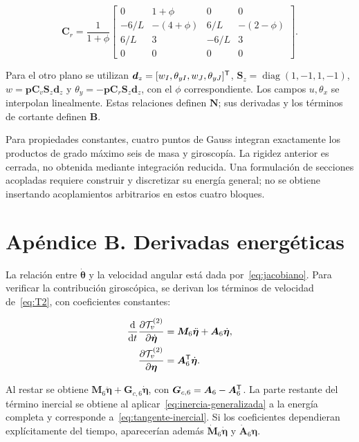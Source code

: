 \begin{equation}
\bm C_r=\frac1{1+\phi}\begin{bmatrix}
0&1+\phi&0&0\\
-6/L&-(4+\phi)&6/L&-(2-\phi)\\
6/L&3&-6/L&3\\0&0&0&0
\end{bmatrix}.
\end{equation}

Para el otro plano se utilizan $\bm d_z=[w_I,\theta_{yI},w_J,\theta_{yJ}]^\mathsf T$, $\bm S_z=\operatorname{diag}(1,-1,1,-1)$, $w=\bm p\bm C_v\bm S_z\bm d_z$ y $\theta_y=-\bm p\bm C_r\bm S_z\bm d_z$, con el $\phi$ correspondiente. Los campos $u,\theta_x$ se interpolan linealmente. Estas relaciones definen $\bm N$; sus derivadas y los términos de cortante definen $\bm B$.

Para propiedades constantes, cuatro puntos de Gauss integran exactamente los productos de grado máximo seis de masa y giroscopía. La rigidez anterior es cerrada, no obtenida mediante integración reducida. Una formulación de secciones acopladas requiere construir y discretizar su energía general; no se obtiene insertando acoplamientos arbitrarios en estos cuatro bloques.

\section{Apéndice B. Derivadas energéticas}
La relación entre $\dot{\bm\theta}$ y la velocidad angular está dada por~\eqref{eq:jacobiano}. Para verificar la contribución giroscópica, se derivan los términos de velocidad de~\eqref{eq:T2}, con coeficientes constantes:

\begin{align}
\frac{\mathrm d}{\mathrm d t}\frac{\partial\mathcal T_v^{(2)}}{\partial\dot{\bm\eta}}
&=\bm M_6\ddot{\bm\eta}+\bm A_6\dot{\bm\eta},\nonumber\\
\frac{\partial\mathcal T_v^{(2)}}{\partial\bm\eta}
&=\bm A_6^\mathsf T\dot{\bm\eta}.
\end{align}

Al restar se obtiene $\bm M_6\ddot{\bm\eta}+\bm G_{c,6}\dot{\bm\eta}$, con $\bm G_{c,6}=\bm A_6-\bm A_6^\mathsf T$. La parte restante del término inercial se obtiene al aplicar~\eqref{eq:inercia-generalizada} a la energía completa y corresponde a~\eqref{eq:tangente-inercial}. Si los coeficientes dependieran explícitamente del tiempo, aparecerían además $\dot{\bm M}_6\dot{\bm\eta}$ y $\dot{\bm A}_6\bm\eta$.


